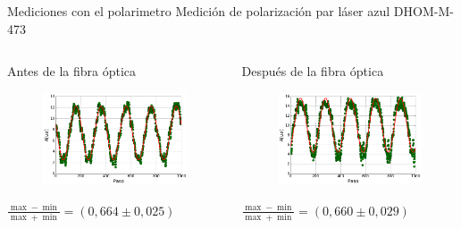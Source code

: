 \begin{frame}{Mediciones con el polarimetro}
    Medición de polarización par láser azul DHOM-M-473  
    \begin{columns}
        \begin{column}{0.5\textwidth}
            Antes de la fibra óptica
            \begin{figure}[H]
                \centering
                \includegraphics[width=\textwidth]{fig/polarimetro/polarizacion_azul}
                \label{fig:polarimetro_calibracion}
            \end{figure}
            $\frac{\max - \min}{\max + \min} = (0,664
 \pm 0,025)$
        \end{column}
        \begin{column}{0.5\textwidth}
        
            Después de la fibra óptica
            \begin{figure}[H]
                \centering
                \includegraphics[width=\textwidth]{fig/polarimetro/polarizacion_azul_fibra}
                \label{fig:polarimetro_calibracion}
            \end{figure}
            $\frac{\max - \min}{\max + \min} = (0,660
 \pm 0,029)$
        \end{column}
    \end{columns}

\end{frame}
